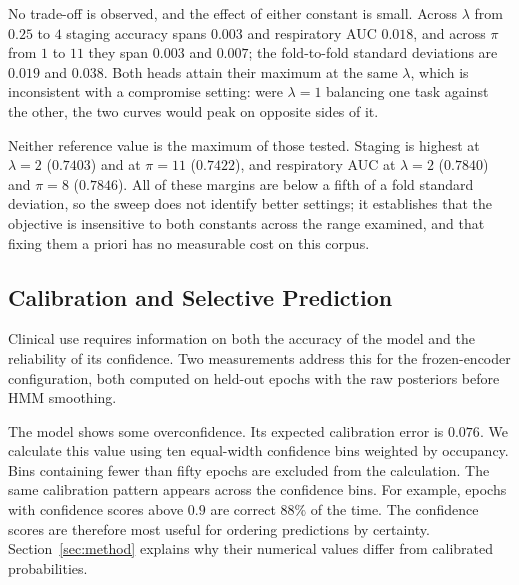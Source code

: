 \documentclass[a4paper,fleqn]{cas-sc}
\begin{document}
No trade-off is observed, and the effect of either constant is small. Across $\lambda$ from
$0.25$ to $4$
staging accuracy spans $0.003$ and respiratory AUC $0.018$, and across $\pi$ from $1$ to $11$
they span $0.003$ and $0.007$; the fold-to-fold standard deviations are $0.019$ and $0.038$.
Both heads attain their maximum at the same $\lambda$, which is inconsistent with a
compromise setting: were $\lambda=1$ balancing one task against the other, the two curves
would peak on opposite sides of it.

Neither reference value is the maximum of those tested. Staging is highest at $\lambda=2$
($0.7403$) and at $\pi=11$ ($0.7422$), and respiratory AUC at $\lambda=2$ ($0.7840$) and
$\pi=8$ ($0.7846$). All of these margins are below a fifth of a fold standard deviation, so
the sweep does not identify better settings; it establishes that the objective is insensitive
to both constants across the range examined, and that fixing them a priori has no measurable
cost on this corpus.

\subsection{Calibration and Selective Prediction}
Clinical use requires information on both the accuracy of the model and the reliability of its confidence. Two measurements address this for the frozen-encoder configuration, both computed on held-out epochs with the raw posteriors before HMM smoothing.


The model shows some overconfidence. Its expected calibration error is $0.076$. We calculate this value using ten equal-width confidence bins weighted by occupancy. Bins containing fewer than fifty epochs are excluded from the calculation. The same calibration pattern appears across the confidence bins. For example, epochs with confidence scores above $0.9$ are correct $88\%$ of the time. The confidence scores are therefore most useful for ordering predictions by certainty. Section~\ref{sec:method} explains why their numerical values differ from calibrated probabilities.
\end{document}
